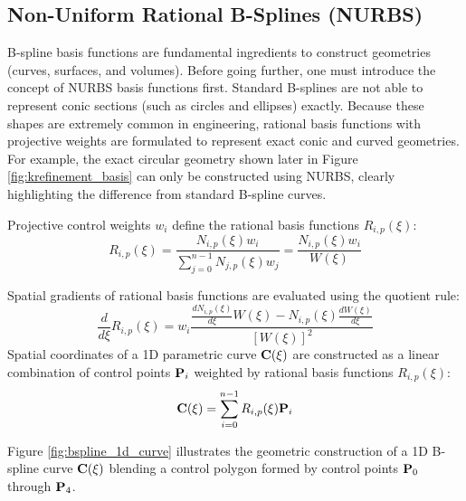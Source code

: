 \subsection{Non-Uniform Rational B-Splines (NURBS)}
B-spline basis functions are fundamental ingredients to construct geometries (curves, surfaces, and volumes). Before going further, one must introduce the concept of NURBS basis functions first. Standard B-splines are not able to represent conic sections (such as circles and ellipses) exactly. Because these shapes are extremely common in engineering, rational basis functions with projective weights are formulated to represent exact conic and curved geometries. For example, the exact circular geometry shown later in Figure \ref{fig:krefinement_basis} can only be constructed using NURBS, clearly highlighting the difference from standard B-spline curves.

Projective control weights $w_i$ define the rational basis functions $R_{i,p}(\xi)$:
\begin{equation}
    R_{i,p}(\xi) = \frac{N_{i,p}(\xi) w_i}{\sum_{j=0}^{n-1} N_{j,p}(\xi) w_j} = \frac{N_{i,p}(\xi) w_i}{W(\xi)}
\end{equation}

Spatial gradients of rational basis functions are evaluated using the quotient rule:
\begin{equation}
    \frac{d}{d\xi} R_{i,p}(\xi) = w_i \frac{\frac{d N_{i,p}(\xi)}{d\xi} W(\xi) - N_{i,p}(\xi) \frac{d W(\xi)}{d\xi}}{[W(\xi)]^2}
\end{equation}
Spatial coordinates of a 1D parametric curve $\mathbf{C}(\xi)$ are constructed as a linear combination of control points $\mathbf{P}_i$ weighted by rational basis functions $R_{i,p}(\xi)$:
\begin{equation}
    \mathbf{C}(\xi) = \sum_{i=0}^{n-1} R_{i,p}(\xi) \mathbf{P}_i
\end{equation}

Figure \ref{fig:bspline_1d_curve} illustrates the geometric construction of a 1D B-spline curve $\mathbf{C}(\xi)$ blending a control polygon formed by control points $\mathbf{P}_0$ through $\mathbf{P}_4$.

